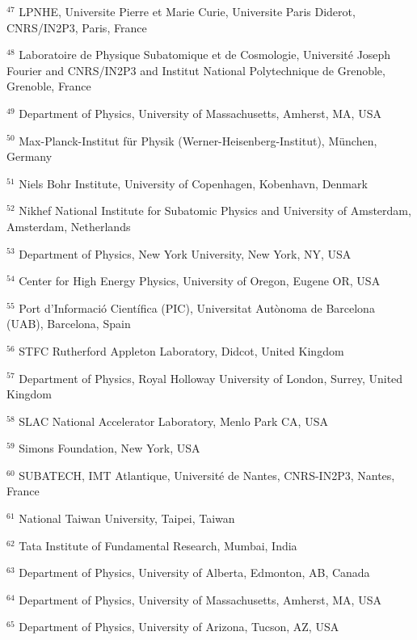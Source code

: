 \par {\footnotesize $^{47}$ LPNHE, Universite Pierre et Marie Curie, Universite Paris Diderot, CNRS/IN2P3, Paris, France}
\par {\footnotesize $^{48}$ Laboratoire de Physique Subatomique et de Cosmologie, Université Joseph Fourier and CNRS/IN2P3 and Institut National Polytechnique de Grenoble, Grenoble, France}
\par {\footnotesize $^{49}$ Department of Physics, University of Massachusetts, Amherst, MA, USA}
\par {\footnotesize $^{50}$ Max-Planck-Institut für Physik (Werner-Heisenberg-Institut), München, Germany}
\par {\footnotesize $^{51}$ Niels Bohr Institute, University of Copenhagen, Kobenhavn, Denmark}
\par {\footnotesize $^{52}$ Nikhef National Institute for Subatomic Physics and University of Amsterdam, Amsterdam, Netherlands}
\par {\footnotesize $^{53}$ Department of Physics, New York University, New York, NY, USA}
\par {\footnotesize $^{54}$ Center for High Energy Physics, University of Oregon, Eugene OR, USA}
\par {\footnotesize $^{55}$ Port d’Informació Científica (PIC), Universitat Autònoma de Barcelona (UAB), Barcelona, Spain}
\par {\footnotesize $^{56}$ STFC Rutherford Appleton Laboratory, Didcot, United Kingdom}
\par {\footnotesize $^{57}$ Department of Physics, Royal Holloway University of London, Surrey, United Kingdom}
\par {\footnotesize $^{58}$ SLAC National Accelerator Laboratory, Menlo Park CA, USA}
\par {\footnotesize $^{59}$ Simons Foundation, New York, USA}
\par {\footnotesize $^{60}$ SUBATECH, IMT Atlantique, Université de Nantes, CNRS-IN2P3, Nantes, France}
\par {\footnotesize $^{61}$ National Taiwan University, Taipei, Taiwan}
\par {\footnotesize $^{62}$ Tata Institute of Fundamental Research, Mumbai, India}
\par {\footnotesize $^{63}$ Department of Physics, University of Alberta, Edmonton, AB, Canada}
\par {\footnotesize $^{64}$ Department of Physics, University of Massachusetts, Amherst, MA, USA}
\par {\footnotesize $^{65}$ Department of Physics, University of Arizona, Tucson, AZ, USA}
